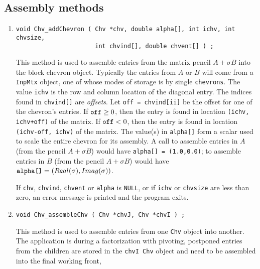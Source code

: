 \subsection{Assembly methods}
\label{subsection:Chv:proto:assembly}
\par
\begin{enumerate}
\item
\begin{verbatim}
void Chv_addChevron ( Chv *chv, double alpha[], int ichv, int chvsize,
                      int chvind[], double chvent[] ) ;
\end{verbatim}
This method is used to assemble entries from the matrix pencil
$A + \sigma B$ into the block chevron object.
Typically the entries from $A$ or $B$ will come from a {\tt InpMtx} 
object, one of whose modes of storage is by single {\tt chevrons}.
The value {\tt ichv} is the row and column location of the diagonal
entry.
The indices found in {\tt chvind[]} are {\it offsets}.
Let {\tt off = chvind[ii]} be the offset for one of the chevron's
entries.
If $\mbox{\tt off} \ge 0$, then the entry is found in location 
{\tt (ichv, ichv+off)} of the matrix.
If $\mbox{\tt off} < 0$, then the entry is found in location 
{\tt (ichv-off, ichv)} of the matrix.
The value(s) in {\tt alpha[]} form a scalar 
used to scale the entire chevron for its assembly.
A call to assemble entries in $A$ (from the pencil $A + \sigma B$)
would have {\tt alpha[] = (1.0,0.0)};
to assemble entries in $B$ (from the pencil $A + \sigma B$)
would have $\mbox{\tt alpha[]} = (Real(\sigma),Imag(\sigma))$.
\par {}
If {\tt chv}, {\tt chvind}, {\tt chvent} or {\tt alpha} is {\tt NULL},
or if {\tt ichv} or  {\tt chvsize} are less than zero,
an error message is printed and the program exits.
\item
\begin{verbatim}
void Chv_assembleChv ( Chv *chvJ, Chv *chvI ) ;
\end{verbatim}
This method is used to assemble entries from one {\tt Chv} object
into another.
The application is during a factorization with pivoting,
postponed entries from the children are stored in the {\tt chvI Chv}
object and need to be assembled into the final working front,

\end{enumerate}
